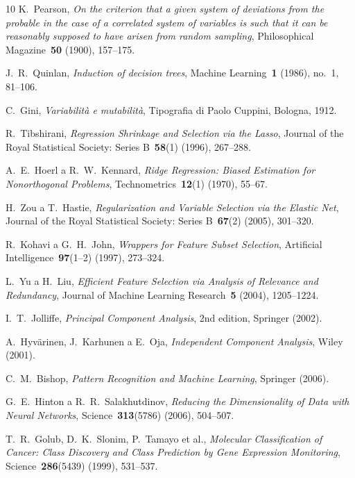 \begin{thebibliography}{10}
K.~Pearson, \textit{On the criterion that a given system of deviations from the probable in the case of a correlated system of variables is such that it can be reasonably supposed to have arisen from random sampling}, Philosophical Magazine~\textbf{50} (1900), 157--175.

J.~R.~Quinlan, \textit{Induction of decision trees}, Machine Learning~\textbf{1} (1986), no.~1, 81--106.

C.~Gini, \textit{Variabilità e mutabilità}, Tipografia di Paolo Cuppini, Bologna, 1912.

R.~Tibshirani, \textit{Regression Shrinkage and Selection via the Lasso}, 
Journal of the Royal Statistical Society: Series B~\textbf{58}(1) (1996), 267--288.

A.~E.~Hoerl a R.~W.~Kennard, \textit{Ridge Regression: Biased Estimation for Nonorthogonal Problems}, 
Technometrics~\textbf{12}(1) (1970), 55--67.

H.~Zou a T.~Hastie, \textit{Regularization and Variable Selection via the Elastic Net}, 
Journal of the Royal Statistical Society: Series B~\textbf{67}(2) (2005), 301--320.

R.~Kohavi a G.~H.~John, \textit{Wrappers for Feature Subset Selection}, 
Artificial Intelligence~\textbf{97}(1--2) (1997), 273--324.

L.~Yu a H.~Liu, \textit{Efficient Feature Selection via Analysis of Relevance and Redundancy}, 
Journal of Machine Learning Research~\textbf{5} (2004), 1205--1224.

I.~T.~Jolliffe, \textit{Principal Component Analysis}, 
2nd edition, Springer (2002).

A.~Hyvärinen, J.~Karhunen a E.~Oja, \textit{Independent Component Analysis}, 
Wiley (2001).

C.~M.~Bishop, \textit{Pattern Recognition and Machine Learning}, 
Springer (2006).

G.~E.~Hinton a R.~R.~Salakhutdinov, \textit{Reducing the Dimensionality of Data with Neural Networks}, 
Science~\textbf{313}(5786) (2006), 504--507.

T.~R.~Golub, D.~K.~Slonim, P.~Tamayo et al., 
\textit{Molecular Classification of Cancer: Class Discovery and Class Prediction by Gene Expression Monitoring}, 
Science~\textbf{286}(5439) (1999), 531--537.


\end{thebibliography}
